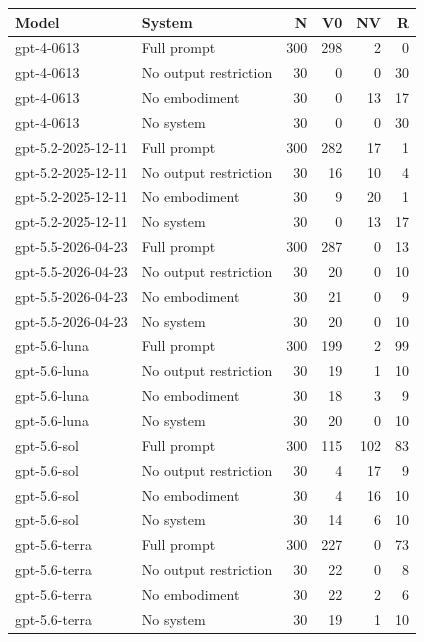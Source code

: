 \begin{tabular}{llrrrr}
\toprule
Model & System & N & V0 & NV & R \\
\midrule
gpt-4-0613 & Full prompt & 300 & 298 & 2 & 0 \\
gpt-4-0613 & No output restriction & 30 & 0 & 0 & 30 \\
gpt-4-0613 & No embodiment & 30 & 0 & 13 & 17 \\
gpt-4-0613 & No system & 30 & 0 & 0 & 30 \\
gpt-5.2-2025-12-11 & Full prompt & 300 & 282 & 17 & 1 \\
gpt-5.2-2025-12-11 & No output restriction & 30 & 16 & 10 & 4 \\
gpt-5.2-2025-12-11 & No embodiment & 30 & 9 & 20 & 1 \\
gpt-5.2-2025-12-11 & No system & 30 & 0 & 13 & 17 \\
gpt-5.5-2026-04-23 & Full prompt & 300 & 287 & 0 & 13 \\
gpt-5.5-2026-04-23 & No output restriction & 30 & 20 & 0 & 10 \\
gpt-5.5-2026-04-23 & No embodiment & 30 & 21 & 0 & 9 \\
gpt-5.5-2026-04-23 & No system & 30 & 20 & 0 & 10 \\
gpt-5.6-luna & Full prompt & 300 & 199 & 2 & 99 \\
gpt-5.6-luna & No output restriction & 30 & 19 & 1 & 10 \\
gpt-5.6-luna & No embodiment & 30 & 18 & 3 & 9 \\
gpt-5.6-luna & No system & 30 & 20 & 0 & 10 \\
gpt-5.6-sol & Full prompt & 300 & 115 & 102 & 83 \\
gpt-5.6-sol & No output restriction & 30 & 4 & 17 & 9 \\
gpt-5.6-sol & No embodiment & 30 & 4 & 16 & 10 \\
gpt-5.6-sol & No system & 30 & 14 & 6 & 10 \\
gpt-5.6-terra & Full prompt & 300 & 227 & 0 & 73 \\
gpt-5.6-terra & No output restriction & 30 & 22 & 0 & 8 \\
gpt-5.6-terra & No embodiment & 30 & 22 & 2 & 6 \\
gpt-5.6-terra & No system & 30 & 19 & 1 & 10 \\
\bottomrule
\end{tabular}
